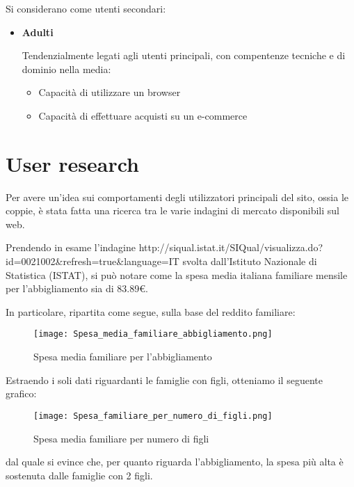 \documentclass[12pt,italian,]{report}
\providecommand{\tightlist}{%
  \setlength{\itemsep}{0pt}\setlength{\parskip}{0pt}}
\begin{document}
Si considerano come utenti secondari:

\begin{itemize}
\item
  \textbf{Adulti}

  Tendenzialmente legati agli utenti principali, con compentenze
  tecniche e di dominio nella media:

  \begin{itemize}
  \tightlist
  \item
    Capacità di utilizzare un browser
  \item
    Capacità di effettuare acquisti su un e-commerce
  \end{itemize}
\end{itemize}

\hypertarget{user-research}{%
\section{User research}\label{user-research}}

Per avere un'idea sui comportamenti degli utilizzatori principali del
sito, ossia le coppie, è stata fatta una ricerca tra le varie indagini
di mercato disponibili sul web.

Prendendo in esame l'indagine
http://siqual.istat.it/SIQual/visualizza.do?id=0021002\&refresh=true\&language=IT
svolta dall'Istituto Nazionale di Statistica (ISTAT), si può notare come
la spesa media italiana familiare mensile per l'abbigliamento sia di
83.89€.

In particolare, ripartita come segue, sulla base del reddito familiare:

\begin{figure}
\centering
\texttt{[image: Spesa\_media\_familiare\_abbigliamento.png]}
\caption{Spesa media familiare per l'abbigliamento}
\end{figure}

Estraendo i soli dati riguardanti le famiglie con figli, otteniamo il
seguente grafico:

\begin{figure}
\centering
\texttt{[image: Spesa\_familiare\_per\_numero\_di\_figli.png]}
\caption{Spesa media familiare per numero di figli}
\end{figure}

dal quale si evince che, per quanto riguarda l'abbigliamento, la spesa
più alta è sostenuta dalle famiglie con 2 figli.
\end{document}
